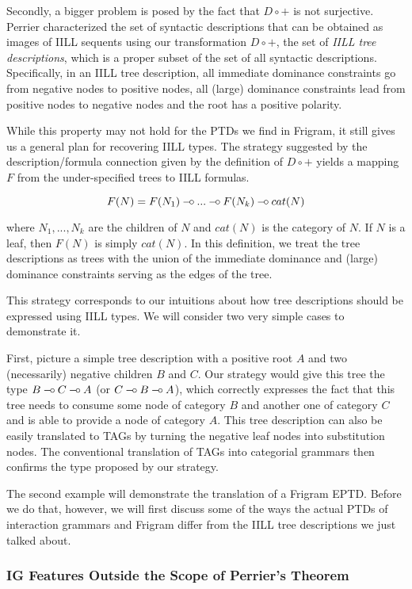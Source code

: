 Secondly, a bigger problem is posed by the fact that $D \circ +$ is not
surjective. Perrier \cite{perrier2001intuitionistic} characterized the
set of syntactic descriptions that can be obtained as images of IILL
sequents using our transformation $D \circ +$, the set of \emph{IILL
  tree descriptions}, which is a proper subset of the set of all
syntactic descriptions. Specifically, in an IILL tree description, all
immediate dominance constraints go from negative nodes to positive
nodes, all (large) dominance constraints lead from positive nodes to
negative nodes and the root has a positive polarity.

While this property may not hold for the PTDs we find in Frigram, it
still gives us a general plan for recovering IILL types. The strategy
suggested by the description/formula connection given by the definition
of $D \circ +$ yields a mapping $F$ from the under-specified trees to
IILL formulas.

$$
F(N) = F(N_1) \mathbin{{-}\mkern-3.5mu{\circ}} ... \mathbin{{-}\mkern-3.5mu{\circ}} F(N_k) \mathbin{{-}\mkern-3.5mu{\circ}} cat(N)
$$

where $N_1, ..., N_k$ are the children of $N$ and $cat(N)$ is the
category of $N$. If $N$ is a leaf, then $F(N)$ is simply $cat(N)$. In
this definition, we treat the tree descriptions as trees with the union
of the immediate dominance and (large) dominance constraints serving as
the edges of the tree.

This strategy corresponds to our intuitions about how tree descriptions
should be expressed using IILL types. We will consider two very simple
cases to demonstrate it.

First, picture a simple tree description with a positive root $A$ and
two (necessarily) negative children $B$ and $C$. Our strategy would give
this tree the type $B \mathbin{{-}\mkern-3.5mu{\circ}} C \mathbin{{-}\mkern-3.5mu{\circ}} A$ (or $C \mathbin{{-}\mkern-3.5mu{\circ}} B \mathbin{{-}\mkern-3.5mu{\circ}} A$), which
correctly expresses the fact that this tree needs to consume some node
of category $B$ and another one of category $C$ and is able to provide a
node of category $A$. This tree description can also be easily
translated to TAGs by turning the negative leaf nodes into substitution
nodes. The conventional translation of TAGs into categorial grammars
then confirms the type proposed by our strategy.

The second example will demonstrate the translation of a Frigram
EPTD. Before we do that, however, we will first discuss some of the ways
the actual PTDs of interaction grammars and Frigram differ from the IILL
tree descriptions we just talked about.

\subsubsection{IG Features Outside the Scope of Perrier's Theorem}

